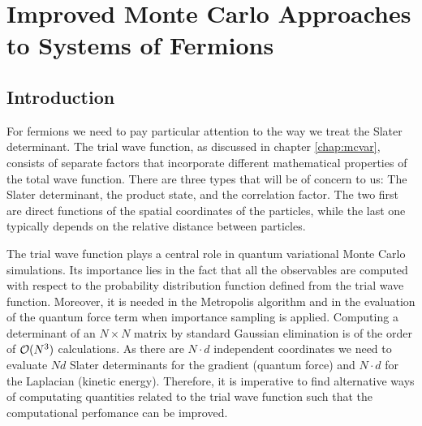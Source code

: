 \chapter{Improved Monte Carlo Approaches to Systems of Fermions}\label{chap:improvedvmc}

\section{Introduction} 
For fermions we need to pay particular attention to the way we treat the Slater determinant. 
The trial wave function, as discussed in chapter \ref{chap:mcvar}, 
consists of separate factors that
incorporate different mathematical properties of the total
wave function. There are three types that will be of concern to us:
The Slater determinant, the product state, and the correlation
factor. The two first are direct functions of the spatial coordinates
of the particles, while the last one typically depends on the relative distance
between particles.


The trial wave function plays a central role in quantum variational Monte Carlo simulations. Its importance lies in the fact that all the observables are computed with respect to the probability distribution function defined from the trial wave function. Moreover, it is needed in the Metropolis algorithm and in the evaluation of the quantum force term when importance sampling is applied. Computing a determinant of an $N \times N$ matrix by standard Gaussian elimination is of the order of ${\cal O}(N^3)$ calculations. As there are $N\cdot d$ independent coordinates we need to evaluate $Nd$ Slater determinants for the gradient (quantum force) and $N\cdot d$ for the Laplacian (kinetic energy). Therefore, it is imperative 
to find alternative ways of computating quantities related to the trial wave function such that the computational perfomance can be improved.

